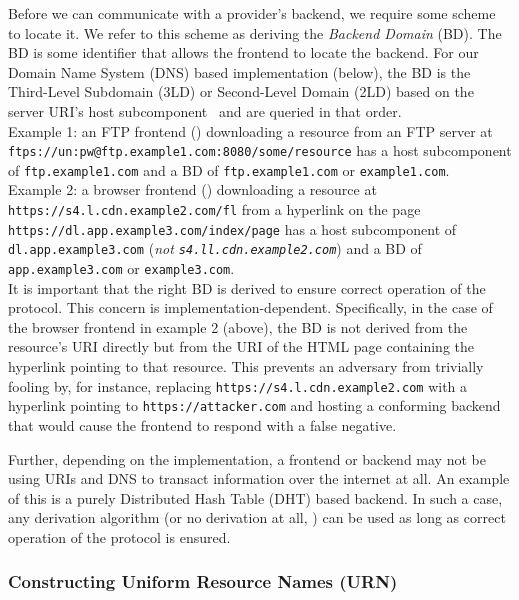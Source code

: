 Before we can communicate with a provider's backend, we require some scheme to
locate it. We refer to this scheme as deriving the \emph{Backend Domain} (BD).
The BD is some identifier that allows the frontend to locate the backend. For
our Domain Name System (DNS) based implementation (below), the BD is the
Third-Level Subdomain (3LD) or Second-Level Domain (2LD) based on the server
URI's host subcomponent~\cite{RFC3986} and are queried in that order. \\

Example 1: an FTP frontend () downloading a
resource from an FTP server at
\texttt{ftps://un:pw@ftp.example1.com:8080/some/resource} has a host
subcomponent of \texttt{ftp.example1.com} and a BD of \texttt{ftp.example1.com}
or \texttt{example1.com}. \\

Example 2: a browser frontend () downloading a resource at \texttt{https://s4.l.cdn.example2.com/fl}
from a hyperlink on the page \texttt{https://dl.app.example3.com/index/page} has
a host subcomponent of \texttt{dl.app.example3.com} (\emph{not
\texttt{s4.ll.cdn.example2.com}}) and a BD of \texttt{app.example3.com} or
\texttt{example3.com}. \\

It is important that the right BD is derived to ensure correct operation of the
protocol. This concern is implementation-dependent. Specifically, in the case of
the browser frontend in example 2 (above), the BD is not derived from the
resource's URI directly but from the URI of the HTML page containing the
hyperlink pointing to that resource. This prevents an adversary from trivially
fooling \SYSTEM{} by, for instance, replacing
\texttt{https://s4.l.cdn.example2.com} with a hyperlink pointing to
\texttt{https://attacker.com} and hosting a conforming \SYSTEM{} backend that
would cause the frontend to respond with a false negative.

Further, depending on the implementation, a frontend or backend may not be using
URIs and DNS to transact information over the internet at all. An example of
this is a purely Distributed Hash Table (DHT) based backend. In such a case, any
derivation algorithm (or no derivation at all, ) can be
used as long as correct operation of the protocol is ensured.

\subsubsection{Constructing Uniform Resource Names (URN)}

